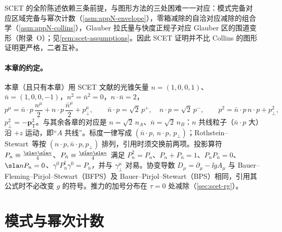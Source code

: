 SCET 的全阶陈述依赖三条前提，与图形方法的三处困难一一对应：模式完备对应区域完备与幂次计数（\cref{asm:appN-envelope}），零箱减除的自洽对应减除的组合学（\cref{asm:appN-collins}），Glauber 拉氏量与快度正规子对应 Glauber 区的围道变形（附录~O）；见\cref{rem:scet-assumptions}。因此 SCET 证明并不比 Collins 的图形证明更严格，二者互补。

\paragraph{本章的约定。}
本章（且只有本章）用 SCET 文献的光锥矢量 $n=(1,0,0,1)$、$\bar n=(1,0,0,-1)$，$n^2=\bar n^2=0$，$n\cdot\bar n=2$，
\begin{equation}\label{eq:scet-decomp}
p^\mu=\bar n\cdot p\,\frac{n^\mu}{2}+n\cdot p\,\frac{\bar n^\mu}{2}+p_\perp^\mu,\qquad
\bar n\cdot p=\sqrt2\,p^+,\quad n\cdot p=\sqrt2\,p^-,\qquad p^2=\bar n\cdot p\,n\cdot p+p_\perp^2 ,
\end{equation}
$p_\perp^2=-\bm p_{\mathrm T}^2$。与其余各章的对应是 $n=\sqrt2\,n_A$、$\bar n=\sqrt2\,n_B$：$n$ 共线粒子（$\bar n\cdot p$ 大）沿 $+z$ 运动，即“$A$ 共线”。标度一律写成 $(\bar n\cdot p,\,n\cdot p,\,p_\perp)$；Rothstein--Stewart~\cite{RothsteinStewart2016}等按 $(n\cdot p,\bar n\cdot p,p_\perp)$ 排列，引用时须交换前两项。投影算符 $P_n\equiv\frac{\sla n\bar{\sla n}}{4}$、$P_{\bar n}\equiv\frac{\bar{\sla n}\sla n}{4}$ 满足 $P_n^2=P_n$、$P_n+P_{\bar n}=1$、$P_nP_{\bar n}=0$、$\sla nP_n=0$、$\gamma^0P_n^\dagger\gamma^0=P_{\bar n}$，并与 $\gamma_\perp^\mu$ 对易。协变导数 $D_\mu=\partial_\mu-\ii gA_\mu$ 与 Bauer--Fleming--Pirjol--Stewart（BFPS）\cite{BauerEtAl2001}及 Bauer--Pirjol--Stewart（BPS）\cite{BauerPirjolStewart2002}相同，引用其公式时不必改变 $g$ 的符号。推力的加号分布在 $\tau=0$ 处减除（\cref{sec:scet-rg}）。

\section{模式与幂次计数}\label{sec:scet-modes}


